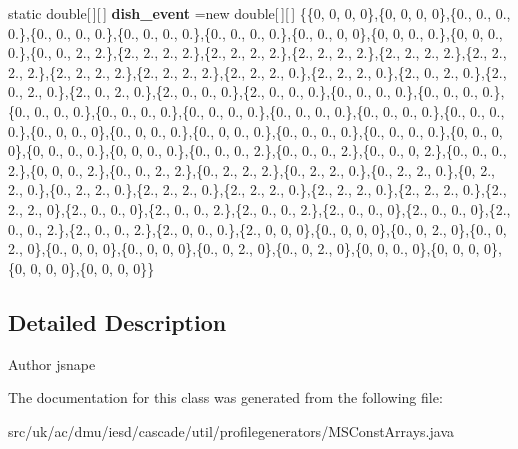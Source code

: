 \begin{DoxyCompactItemize}
\item 
\hypertarget{classuk_1_1ac_1_1dmu_1_1iesd_1_1cascade_1_1util_1_1profilegenerators_1_1_m_s_const_arrays_a9a27dfc851f373e7077b3864b03dc786}{static double\mbox{[}$\,$\mbox{]}\mbox{[}$\,$\mbox{]} {\bfseries dish\-\_\-event} =new double\mbox{[}$\,$\mbox{]}\mbox{[}$\,$\mbox{]} \{\{0, 0, 0, 0\},\{0, 0, 0, 0\},\{0., 0., 0., 0.\},\{0., 0., 0., 0.\},\{0., 0., 0., 0.\},\{0., 0., 0., 0.\},\{0., 0., 0, 0\},\{0, 0, 0., 0.\},\{0, 0, 0., 0.\},\{0., 0., 2., 2.\},\{2., 2., 2., 2.\},\{2., 2., 2., 2.\},\{2., 2., 2., 2.\},\{2., 2., 2., 2.\},\{2., 2., 2., 2.\},\{2., 2., 2., 2.\},\{2., 2., 2., 2.\},\{2., 2., 2., 0.\},\{2., 2., 2., 0.\},\{2., 0., 2., 0.\},\{2., 0., 2., 0.\},\{2., 0., 2., 0.\},\{2., 0., 0., 0.\},\{2., 0., 0., 0.\},\{0., 0., 0., 0.\},\{0., 0., 0., 0.\},\{0., 0., 0., 0.\},\{0., 0., 0., 0.\},\{0., 0., 0., 0.\},\{0., 0., 0., 0.\},\{0., 0., 0., 0.\},\{0., 0., 0., 0.\},\{0., 0, 0., 0\},\{0., 0, 0., 0.\},\{0., 0, 0., 0.\},\{0., 0., 0., 0.\},\{0., 0., 0., 0.\},\{0, 0., 0, 0\},\{0, 0., 0., 0.\},\{0, 0, 0., 0.\},\{0., 0., 0., 2.\},\{0., 0., 0., 2.\},\{0., 0., 0, 2.\},\{0., 0., 0., 2.\},\{0, 0, 0., 2.\},\{0., 0., 2., 2.\},\{0., 2., 2., 2.\},\{0., 2., 2., 0.\},\{0., 2., 2., 0.\},\{0, 2., 2., 0.\},\{0., 2., 2., 0.\},\{2., 2., 2., 0.\},\{2., 2., 2., 0.\},\{2., 2., 2., 0.\},\{2., 2., 2., 0.\},\{2., 2., 2., 0\},\{2., 0., 0., 0\},\{2., 0., 0., 2.\},\{2., 0., 0., 2.\},\{2., 0., 0., 0\},\{2., 0., 0., 0\},\{2., 0., 0., 2.\},\{2., 0., 0., 2.\},\{2., 0, 0., 0.\},\{2., 0, 0, 0\},\{0., 0, 0, 0\},\{0., 0, 2., 0\},\{0., 0, 2., 0\},\{0., 0, 0, 0\},\{0., 0, 0, 0\},\{0., 0, 2., 0\},\{0., 0, 2., 0\},\{0, 0, 0., 0\},\{0, 0, 0, 0\},\{0, 0, 0, 0\},\{0, 0, 0, 0\}\}}\label{classuk_1_1ac_1_1dmu_1_1iesd_1_1cascade_1_1util_1_1profilegenerators_1_1_m_s_const_arrays_a9a27dfc851f373e7077b3864b03dc786}

\end{DoxyCompactItemize}


\subsection{Detailed Description}
\begin{DoxyAuthor}{Author}
jsnape 
\end{DoxyAuthor}


The documentation for this class was generated from the following file\-:\begin{DoxyCompactItemize}
\item 
src/uk/ac/dmu/iesd/cascade/util/profilegenerators/M\-S\-Const\-Arrays.\-java\end{DoxyCompactItemize}
